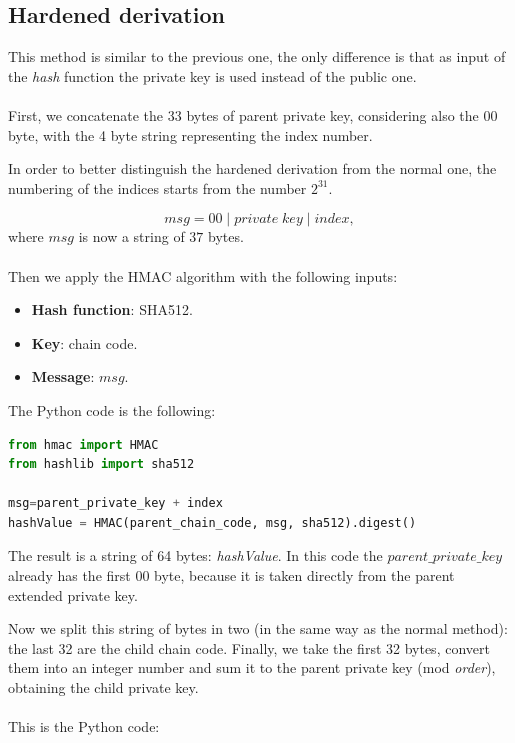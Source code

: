 \subsection{Hardened derivation}
This method is similar to the previous one, the only difference is that as input of the \textit{hash} function the private key is used instead of the public one. \\ \\
First, we concatenate the 33 bytes of parent private key, considering also the $00$ byte, with the 4 byte string representing the index number.

\begin{remark}
In order to better distinguish the hardened derivation from the normal one, the numbering of the indices starts from the number $2^{31}.$
\end{remark} 
\begin{equation*}
msg = 00 \;|\; private\;key \;|\; index,
\end{equation*}
where $msg$ is now a string of $37$ bytes. \\ \\
Then we apply the HMAC algorithm with the following inputs:

\begin{itemize}[label=$\odot$]
	\item \textbf{Hash function}: SHA512.
	\item \textbf{Key}: chain code.
	\item \textbf{Message}: $msg$.
\end{itemize}
The Python code is the following:
\begin{lstlisting}[language=Python]
from hmac import HMAC
from hashlib import sha512

msg=parent_private_key + index
hashValue = HMAC(parent_chain_code, msg, sha512).digest()
\end{lstlisting}
\begin{flushleft}
	The result is a string of 64 bytes: \textit{hashValue}. In this code the $parent\_private\_key$ already has the first $00$ byte, because it is taken directly from the parent extended private key.
\end{flushleft}
Now we split this string of bytes in two (in the same way as the normal method): the last 32 are the child chain code. Finally, we take the first 32 bytes, convert them into an integer number and sum it to the parent private key (mod \textit{order}), obtaining the child private key.\\ \\
This is the Python code:

